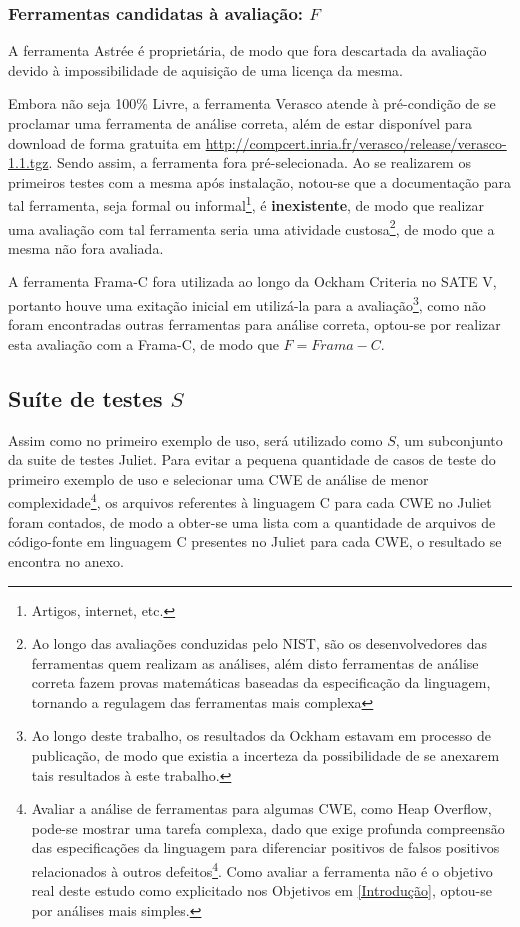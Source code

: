 \subsubsection{Ferramentas candidatas à avaliação: $F$}

A ferramenta Astrée é proprietária, de modo que fora descartada da avaliação devido à impossibilidade de aquisição de uma licença da mesma.

Embora não seja 100\% Livre, a ferramenta Verasco atende à pré-condição de se proclamar uma ferramenta de análise correta, além de estar disponível para download de forma gratuita em \url{http://compcert.inria.fr/verasco/release/verasco-1.1.tgz}. Sendo assim, a ferramenta fora pré-selecionada. Ao se realizarem os primeiros testes com a mesma após instalação, notou-se que a documentação para tal ferramenta, seja formal ou informal\footnote{Artigos, internet, etc.}, é \textbf{inexistente}, de modo que realizar uma avaliação com tal ferramenta seria uma atividade custosa\footnote{Ao longo das avaliações conduzidas pelo NIST, são os desenvolvedores das ferramentas quem realizam as análises, além disto ferramentas de análise correta fazem provas matemáticas baseadas da especificação da linguagem, tornando a regulagem das ferramentas mais complexa}, de modo que a mesma não fora avaliada.

A ferramenta Frama-C fora utilizada ao longo da Ockham Criteria no SATE V, portanto houve uma exitação inicial em utilizá-la para a avaliação\footnote{Ao longo deste trabalho, os resultados da Ockham estavam em processo de publicação, de modo que existia a incerteza da possibilidade de se anexarem tais resultados à este trabalho.}, como não foram encontradas outras ferramentas para análise correta, optou-se por realizar esta avaliação com a Frama-C, de modo que
$F = {Frama-C}$.

\subsection{Suíte de testes $S$}

Assim como no primeiro exemplo de uso, será utilizado como $S$, um subconjunto da suite de testes Juliet. Para evitar a pequena quantidade de casos de teste do primeiro exemplo de uso e selecionar uma CWE de análise de menor complexidade\footnote{Avaliar a análise de ferramentas para algumas CWE, como Heap Overflow, pode-se mostrar uma tarefa complexa, dado que exige profunda compreensão das especificações da linguagem para diferenciar positivos de falsos positivos relacionados à outros defeitos\footnote{Embora o Juliet apresente apenas 1 defeito por caso de teste, uma ferramenta pode apontar, por exemplo, um defeito relacionado à outra classe de fraquezas no mesmo ponto de entrada do defeito apresentado em um caso de testes, não gerando um positivo para o defeito relevante à análise}. Como avaliar a ferramenta não é o objetivo real deste estudo como explicitado nos Objetivos em \ref{Introdução}, optou-se por análises mais simples.}, os arquivos referentes à linguagem C para cada CWE no Juliet foram contados, de modo a obter-se uma lista com a quantidade de arquivos de código-fonte em linguagem C presentes no Juliet para cada CWE, o resultado se encontra no anexo.


